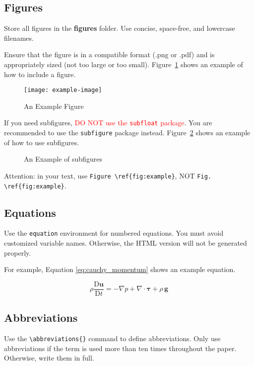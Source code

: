 \subsection{Figures}
Store all figures in the \textbf{figures} folder. Use concise, space-free, and lowercase filenames.

Ensure that the figure is in a compatible format (.png or .pdf) and is appropriately sized (not too large or too small). Figure~\ref{fig:example} shows an example of how to include a figure.

\begin{figure}[htbp!]
  \centering
  \texttt{[image: example-image]}
  \caption{An Example Figure}
  \label{fig:example}
\end{figure}

If you need subfigures, \textcolor{red}{DO NOT use the \texttt{subfloat} package}. You are recommended to use the \texttt{subfigure} package instead. Figure~\ref{fig:subfig_example} shows an example of how to use subfigures.

\begin{figure}[htbp!]
  \centering
  \hspace{0.2cm}
  \caption{An Example of subfigures}
  \label{fig:subfig_example}
\end{figure}

Attention: in your text, use \verb|Figure \ref{fig:example}|, NOT \verb|Fig. \ref{fig:example}|.


\subsection{Equations}
Use the \verb|equation| environment for numbered equations. You must avoid customized variable names. Otherwise, the HTML version will not be generated properly.

For example, Equation \ref{eq:cauchy_momentum} shows an example equation.

\begin{equation} \label{eq:cauchy_momentum}
\rho\frac{\mathrm{D} \mathbf{u}}{\mathrm{D} t} = - \nabla p + \nabla \cdot \boldsymbol \tau + \rho\,\mathbf{g}
\end{equation}

\subsection{Abbreviations}
Use the \verb|\abbreviations{}| command to define abbreviations. Only use abbreviations if the term is used more than ten times throughout the paper. Otherwise, write them in full.


